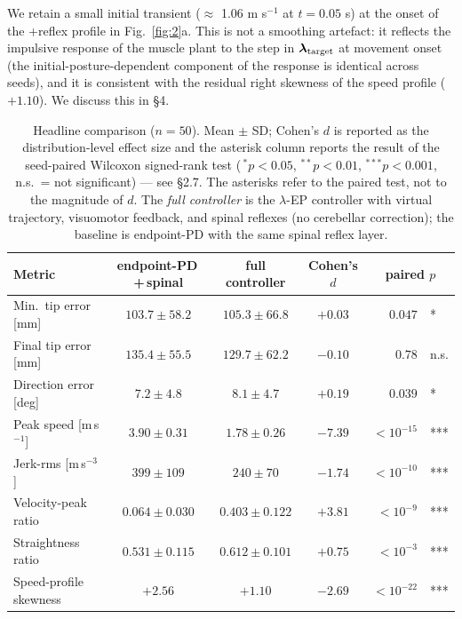 \documentclass[sn-basic]{sn-jnl}
\begin{document}
We retain a small initial transient ($\approx$ 1.06 m s\(^{-1}\) at \(t = 0.05\)
s) at the onset of the +reflex profile in Fig.~\ref{fig:2}a. This is not a
smoothing artefact: it reflects the impulsive response of the muscle
plant to the step in \(\boldsymbol{\lambda}_{\rm target}\) at movement
onset (the initial-posture-dependent component of the response is
identical across seeds), and it is consistent with the residual right
skewness of the speed profile (\(+1.10\)). We discuss this in §4.

\begin{table}[ht]
\centering
\caption{Headline comparison ($n = 50$).  Mean $\pm$ SD; Cohen's $d$
is reported as the distribution-level effect size and the asterisk
column reports the result of the seed-paired Wilcoxon signed-rank
test (\,$^{*}p<0.05$, $^{**}p<0.01$, $^{***}p<0.001$, n.s.\ = not
significant) --- see \S2.7.  The asterisks refer to the paired test,
not to the magnitude of $d$.  The \emph{full controller} is the
$\lambda$-EP controller with virtual trajectory, visuomotor
feedback, and spinal reflexes (no cerebellar correction); the
baseline is endpoint-PD with the same spinal reflex layer.}
\label{tab:headline}
\setlength{\tabcolsep}{5pt}
\renewcommand{\arraystretch}{1.15}
\begin{tabular}{@{}lcccr@{\,}l@{}}
\hline
Metric & endpoint-PD\,+\,spinal & full controller & Cohen's $d$ & \multicolumn{2}{c}{paired $p$} \\
\hline
Min.~tip error [mm]            & $103.7 \pm 58.2$  & $105.3 \pm 66.8$           & $+0.03$ & $0.047$  & * \\
Final tip error [mm]           & $135.4 \pm 55.5$  & $129.7 \pm 62.2$           & $-0.10$ & $0.78$   & n.s. \\
Direction error [deg]            & $7.2 \pm 4.8$     & $8.1 \pm 4.7$              & $+0.19$ & $0.039$  & * \\
Peak speed [m\,s$^{-1}$]       & $3.90 \pm 0.31$   & $1.78 \pm 0.26$            & $-7.39$ & $<10^{-15}$ & *** \\
Jerk-rms [m\,s$^{-3}$]         & $399 \pm 109$     & $240 \pm 70$               & $-1.74$ & $<10^{-10}$ & *** \\
Velocity-peak ratio            & $0.064 \pm 0.030$ & $\mathbf{0.403 \pm 0.122}$ & $+3.81$ & $<10^{-9}$ & *** \\
Straightness ratio             & $0.531 \pm 0.115$ & $0.612 \pm 0.101$          & $+0.75$ & $<10^{-3}$ & *** \\
Speed-profile skewness         & $+2.56$           & $+1.10$                    & $-2.69$ & $<10^{-22}$ & *** \\
\hline
\end{tabular}
\end{table}
\end{document}
